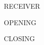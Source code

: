 \documentclass[
  fontsize=12pt,
  paper=a4,
  parskip=half,
  enlargefirstpage=on,
  fromalign=right,
  fromphone=off,
  fromrule=aftername,
  addrfield=on,
  backaddress=on,
  subject=beforeopening,
  locfield=narrow,
  foldmarks=on,
  numericaldate=on,
  headsepline=on,
  firstfoot=on,
]{scrlttr2}
\begin{document}
\begin{letter}{RECEIVER}
\opening{OPENING}

\blindtext

\Blindtext

\closing{CLOSING}
\end{letter}
\end{document}
